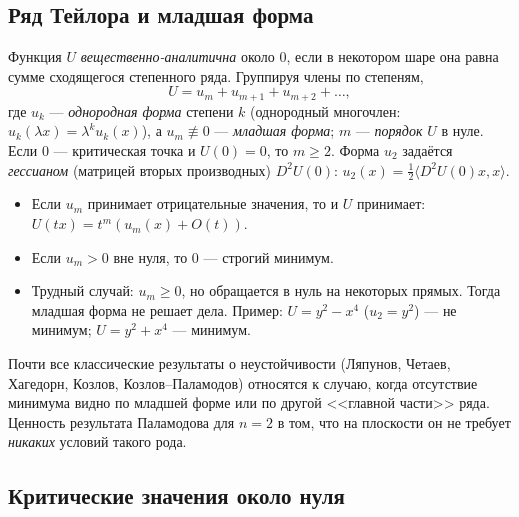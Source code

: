 \documentclass[11pt,a4paper]{article}
\theoremstyle{definition}
\newcommand{\term}[1]{\emph{#1}}
\begin{document}
\subsection{Ряд Тейлора и младшая форма}

Функция $U$ \term{вещественно-аналитична} около $0$, если в некотором шаре она равна сумме
сходящегося степенного ряда. Группируя члены по степеням,
\[
U=u_m+u_{m+1}+u_{m+2}+\dots,
\]
где $u_k$ --- \term{однородная форма} степени $k$ (однородный многочлен: $u_k(\lambda x)=
\lambda^ku_k(x)$), а $u_m\not\equiv0$ --- \term{младшая форма}; $m$ --- \term{порядок} $U$ в нуле.
Если $0$ --- критическая точка и $U(0)=0$, то $m\ge2$. Форма $u_2$ задаётся \term{гессианом}
(матрицей вторых производных) $D^2U(0)$: $u_2(x)=\tfrac12\langle D^2U(0)x,x\rangle$.

\begin{itemize}[leftmargin=*]
\item Если $u_m$ принимает отрицательные значения, то и $U$ принимает: $U(tx)=t^m(u_m(x)+O(t))$.
\item Если $u_m>0$ вне нуля, то $0$ --- строгий минимум.
\item Трудный случай: $u_m\ge0$, но обращается в нуль на некоторых прямых. Тогда младшая форма
не решает дела. Пример: $U=y^2-x^4$ ($u_2=y^2$) --- не минимум; $U=y^2+x^4$ --- минимум.
\end{itemize}

Почти все классические результаты о неустойчивости (Ляпунов, Четаев, Хагедорн, Козлов,
Козлов--Паламодов) относятся к случаю, когда отсутствие минимума видно по младшей форме или
по другой <<главной части>> ряда. Ценность результата Паламодова для $n=2$ в том, что
на плоскости он не требует \emph{никаких} условий такого рода.

\subsection{Критические значения около нуля}
\end{document}
